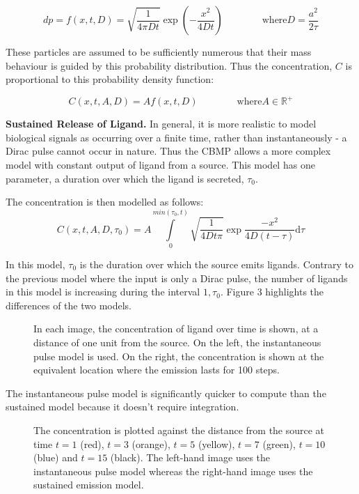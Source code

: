 \documentclass[12pt]{article}
\begin{document}
\begin{equation}
  dp = f(x,t,D) = \sqrt{\frac{1}{4\pi Dt}} \exp(-\frac{x^2}{4Dt}) \qquad \qquad \text{where} D = \frac{a^2}{2\tau}
\end{equation}

These particles are assumed to be sufficiently numerous that their mass 
behaviour is guided by this probability distribution. Thus the 
concentration, \(C\) is proportional to this probability density function:

\begin{equation}
  C(x,t,A,D) = Af(x,t,D) \qquad \qquad \text{where} A \in \mathbb{R}^+
\end{equation}

{\bfseries Sustained Release of Ligand.}
In general, it is more realistic to model biological signals as 
occurring over a finite time, rather than instantaneously - a Dirac 
pulse cannot occur in nature. Thus the CBMP allows a more complex model 
with constant output of ligand from a source. This model has one 
parameter, a duration over which the ligand is secreted, \(\tau_0\).

The concentration is then modelled as follows:
\begin{equation}
  C(x,t,A,D,\tau_0) = A\int\limits_0^{min(\tau_0,t)}\sqrt{\frac{1}{4Dt\pi}}\exp{\frac{-x^2}{4D(t-\tau)}}\mathrm{d}\tau
\end{equation}

In this model, \(\tau_0\) is the duration over which the 
source emits ligands. Contrary to the previous model where the input is 
only a Dirac pulse, the number of ligands in this model is increasing 
during the interval \(1,\tau_0\). Figure 3 
highlights the differences of the two models.

\begin{figure}[H]
\centering
\caption{In each image, the concentration of ligand over time is shown,
  at a distance of one unit from the source. On the left, the instantaneous
  pulse model is used. On the right, the concentration is shown at the
  equivalent location where the emission lasts for 100 steps.}
\end{figure}

The instantaneous pulse model is significantly quicker to compute than the
sustained model because it doesn't require integration.

\begin{figure}[H]
\centering
\caption{The concentration is plotted against the distance from the source
  at time \(t=1\) (red), \(t=3\) 
  (orange), \(t=5\) (yellow), \(t=7\) (green), \(t=10\) (blue) and \(t=15\) (black).
  The left-hand image uses the instantaneous pulse model whereas the right-hand 
  image uses the sustained emission model.} 
\end{figure}
\end{document}
